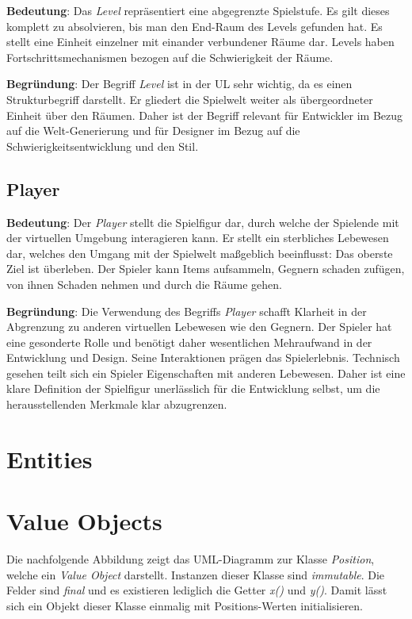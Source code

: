 \textbf{Bedeutung}: Das \textit{Level} repräsentiert eine abgegrenzte
Spielstufe. Es gilt dieses komplett zu absolvieren, bis man den
End-Raum des Levels gefunden hat. Es stellt eine Einheit einzelner mit
einander verbundener Räume dar. Levels haben Fortschrittsmechanismen
bezogen auf die Schwierigkeit der Räume.

\textbf{Begründung}: Der Begriff \textit{Level} ist in der UL sehr
wichtig, da es einen Strukturbegriff darstellt. Er gliedert die
Spielwelt weiter als übergeordneter Einheit über den Räumen. Daher
ist der Begriff relevant für Entwickler im Bezug auf die Welt-Generierung
und für Designer im Bezug auf die Schwierigkeitsentwicklung und den
Stil.



\subsection*{Player}

\textbf{Bedeutung}: Der \textit{Player} stellt die Spielfigur dar,
durch welche der Spielende mit der virtuellen Umgebung interagieren
kann. Er stellt ein sterbliches Lebewesen dar, welches den Umgang mit
der Spielwelt maßgeblich beeinflusst: Das oberste Ziel ist überleben.
Der Spieler kann Items aufsammeln, Gegnern schaden zufügen, von ihnen
Schaden nehmen und durch die Räume gehen.

\textbf{Begründung}: Die Verwendung des Begriffs \textit{Player}
schafft Klarheit in der Abgrenzung zu anderen virtuellen Lebewesen
wie den Gegnern. Der Spieler hat eine gesonderte Rolle und benötigt
daher wesentlichen Mehraufwand in der Entwicklung und Design. Seine
Interaktionen prägen das Spielerlebnis. Technisch gesehen teilt sich
ein Spieler Eigenschaften mit anderen Lebewesen. Daher ist eine klare
Definition der Spielfigur unerlässlich für die Entwicklung selbst, um
die herausstellenden Merkmale klar abzugrenzen.

\section{Entities}

\section{Value Objects}
Die nachfolgende Abbildung zeigt das UML-Diagramm zur Klasse
\textit{Position}, welche ein \textit{Value Object} darstellt.
Instanzen dieser Klasse sind \textit{immutable}. Die Felder sind
\textit{final} und es existieren lediglich die Getter \textit{x()}
und \textit{y()}. Damit lässt sich ein Objekt dieser Klasse einmalig
mit Positions-Werten initialisieren. 


